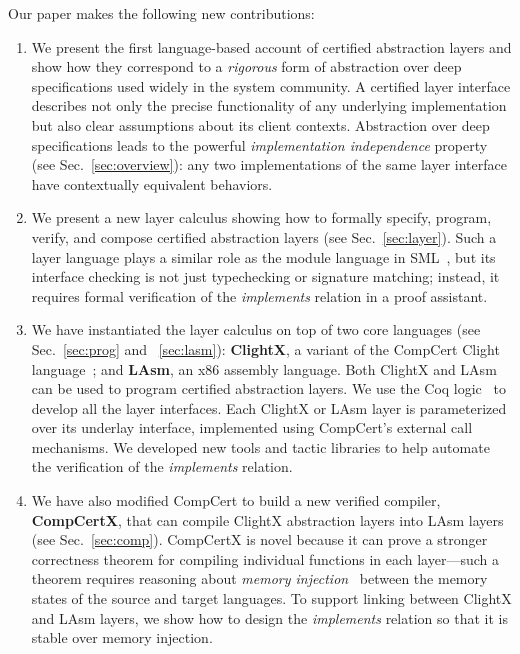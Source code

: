 Our paper makes the following new contributions:
\begin{enumerate}
\item We present the first language-based account of certified
  abstraction layers and show how they correspond to a {\em rigorous} 
  form of abstraction over deep specifications used widely
  in the system community. A certified layer interface
  describes not only the precise functionality of any underlying
  implementation but also clear assumptions about its client contexts.
  Abstraction over deep specifications leads to the powerful
  {\em implementation independence} property
  (see Sec.~\ref{sec:overview}): 
  any two implementations
  of the same layer interface have contextually equivalent behaviors.
\item We present a new layer calculus showing how to formally specify,
  program, verify, and compose certified abstraction layers 
  (see Sec.~\ref{sec:layer}). Such a
  layer language plays a similar role as the module language in
  SML~\cite{milner97}, but its interface checking is not just
  typechecking or signature matching; instead, it requires formal
  verification of the {\em implements} relation in a proof assistant.
\item We have instantiated the layer calculus on top of two core
  languages (see Sec.~\ref{sec:prog} and ~\ref{sec:lasm}): {\bf
    ClightX}, a variant of the CompCert Clight
  language~\cite{blazy-leroy-clight}; and {\bf LAsm}, an x86 assembly
  language.  Both ClightX and LAsm can be used to program certified
  abstraction layers.  We use the Coq logic~\cite{coq} to develop all
  the layer interfaces.  Each ClightX or LAsm layer is parameterized
  over its underlay interface, implemented using CompCert's external
  call mechanisms.  We developed new tools and tactic libraries to
  help automate the verification of the {\em implements} relation.
\item We have also modified CompCert to build a new verified compiler,
  {\bf CompCertX}, that can compile ClightX abstraction layers into
  LAsm layers (see Sec.~\ref{sec:comp}). 
  CompCertX is novel because it can prove a stronger
  correctness theorem for compiling individual functions in each
  layer---such a theorem requires reasoning about {\em memory
    injection}~\cite{leroy08} between the memory states of the source
  and target languages.  To support linking between ClightX and LAsm
  layers, we show how to design the {\em implements} relation so that it
  is stable over memory injection.

\end{enumerate}

